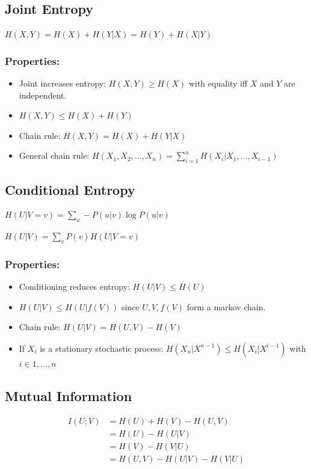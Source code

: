 \documentclass[10pt,a4paper,landscape]{article}
\begin{document}
\begin{multicols*}{4}
\subsection{Joint Entropy}
$H(X,Y) = H(X) + H(Y | X) = H(Y) + H(X | Y)$

\subsubsection{Properties:}
\begin{itemize}
	\item Joint increases entropy: $H(X, Y) \geq H(X)$ with equality iff $X$ and $Y$ are independent.
	\item $H(X,Y) \leq H(X) + H(Y)$
	\item Chain rule: $H(X, Y) = H(X) + H(Y | X)$
	\item General chain rule: $H(X_1, X_2, ..., X_n) = \sum_{i=1}^n H(X_i | X_1, ..., X_{i-1})$
\end{itemize}


\subsection{Conditional Entropy}

$H(U | V = v) = \sum_u - P(u | v) \log P(u | v)$

$H(U | V) = \sum_v P(v) H(U | V = v)$


\subsubsection{Properties:}
\begin{itemize}
	\item Conditioning reduces entropy: $H(U | V) \leq H(U)$
	\item $H(U | V) \leq H(U | f(V))$ since $U, V, f(V)$ form a markov chain.
	\item Chain rule: $H( U | V) = H(U,V) - H(V)$
	\item If $X_i$ is a stationary stochastic process: $H(X_n | X^{n-1}) \leq H(X_i | X^{i-1})$ with $i \in 1, ..., n$
\end{itemize}

\subsection{Mutual Information}
\begin{align*}
I(U; V) &= H(U) + H(V) - H(U,V)\\
		&= H(U) - H(U | V)\\
		&= H(V) - H(V | U)\\
		&= H(U,V) - H(U | V) - H (V | U)
\end{align*}


\end{multicols*}
\end{document}
